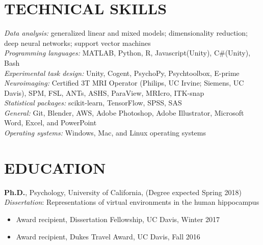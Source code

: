 \documentclass[line,margin,10pt]{res}
\begin{document}
\begin{resume}
\section{TECHNICAL SKILLS} 
\emph{Data analysis:} generalized linear and mixed models; dimensionality reduction; deep neural networks; support vector machines\\
\emph{Programming languages:} MATLAB, Python, R, Javascript(Unity), C\#(Unity), Bash\\
\emph{Experimental task design:} Unity, Cogent, PsychoPy, Psychtoolbox, E-prime  \\
\emph{Neuroimaging:} Certified 3T MRI Operator (Philips, UC Irvine; Siemens, UC Davis), SPM, FSL, ANTs, ASHS, ParaView,  MRIcro, ITK-snap \\
\emph{Statistical packages:} scikit-learn, TensorFlow, SPSS, SAS\\
\emph{General:} Git, Blender, AWS, Adobe Photoshop, Adobe Illustrator, Microsoft Word, Excel, and PowerPoint\\
\emph{Operating systems:} Windows, Mac, and Linux operating systems\\



\section{EDUCATION} 
\textbf{Ph.D.}, Psychology, University of California, (Degree expected Spring 2018)\\
\emph{Dissertation}: Representations of virtual environments in the human hippocampus\\
\begin{itemize} \itemsep -2pt
\item Award recipient, Dissertation Fellowship, UC Davis, Winter 2017
\item	Award recipient, Dukes Travel Award, UC Davis, Fall 2016
\end{itemize}


\end{resume}
\end{document}
